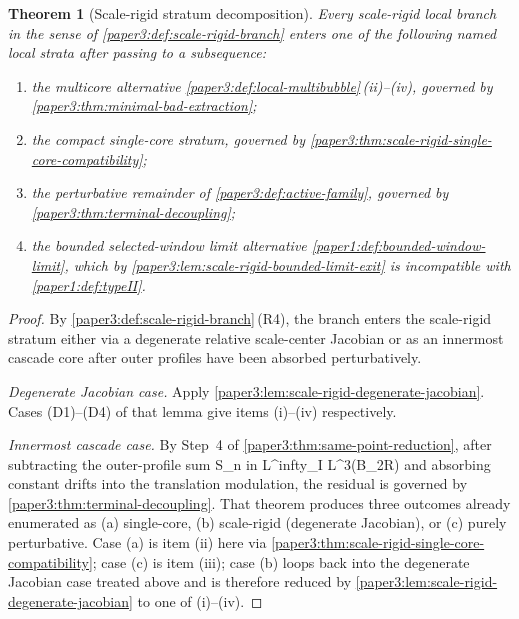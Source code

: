 \documentclass[11pt]{amsart}
\def\({}%
\def\){}%
\def\infty{infty}%
\theoremstyle{plain}
\newtheorem{theorem}{Theorem}[section]
\theoremstyle{definition}
\theoremstyle{remark}
\begin{document}
\begin{theorem}[Scale-rigid stratum decomposition]
\label{paper3:thm:scale-rigid-stratum-decomposition}
Every scale-rigid local branch in the sense of
\cref{paper3:def:scale-rigid-branch} enters one of the following named local
strata after passing to a subsequence:
\begin{enumerate}[label=\textup{(\roman*)}]
\item the multicore alternative \cref{paper3:def:local-multibubble}\,(ii)--(iv),
      governed by \cref{paper3:thm:minimal-bad-extraction};
\item the compact single-core stratum, governed by
      \cref{paper3:thm:scale-rigid-single-core-compatibility};
\item the perturbative remainder of \cref{paper3:def:active-family}, governed
      by \cref{paper3:thm:terminal-decoupling};
\item the bounded selected-window limit alternative
      \cref{paper1:def:bounded-window-limit}, which by
      \cref{paper3:lem:scale-rigid-bounded-limit-exit} is incompatible with
      \cref{paper1:def:typeII}.
\end{enumerate}
\end{theorem}

\begin{proof}
By \cref{paper3:def:scale-rigid-branch}\,(R4), the branch enters the
scale-rigid stratum either via a degenerate relative scale-center Jacobian or
as an innermost cascade core after outer profiles have been absorbed
perturbatively.

\noindent\textit{Degenerate Jacobian case.}  Apply
\cref{paper3:lem:scale-rigid-degenerate-jacobian}.  Cases (D1)--(D4) of that
lemma give items (i)--(iv) respectively.

\noindent\textit{Innermost cascade case.}  By Step~4 of
\cref{paper3:thm:same-point-reduction}, after subtracting the outer-profile
sum \(S_n\) in \(L^\infty_I L^3(B_{2R})\) and absorbing constant drifts
into the translation modulation, the residual is governed by
\cref{paper3:thm:terminal-decoupling}.  That theorem produces three
outcomes already enumerated as (a) single-core, (b) scale-rigid (degenerate
Jacobian), or (c) purely perturbative.  Case (a) is item (ii) here via
\cref{paper3:thm:scale-rigid-single-core-compatibility}; case (c) is item
(iii); case (b) loops back into the degenerate Jacobian case treated above
and is therefore reduced by
\cref{paper3:lem:scale-rigid-degenerate-jacobian} to one of (i)--(iv).
\end{proof}
\end{document}
